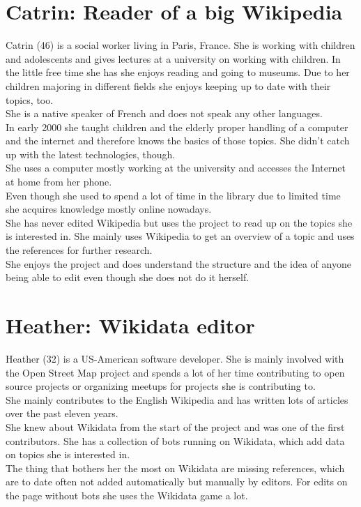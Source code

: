 \section{Catrin: Reader of a big Wikipedia}
Catrin (46) is a social worker living in Paris, France. She is working with children and adolescents and gives lectures at a university on working with children. In the little free time she has she enjoys reading and going to museums. Due to her children majoring in different fields she enjoys keeping up to date with their topics, too. \\
She is a native speaker of French and does not speak any other languages. \\
In early 2000 she taught children and the elderly proper handling of a computer and the internet and therefore knows the basics of those topics. She didn't catch up with the latest technologies, though. \\
She uses a computer mostly working at the university and accesses the Internet at home from her phone. \\
Even though she used to spend a lot of time in the library due to limited time she acquires knowledge mostly online nowadays. \\
She has never edited Wikipedia but uses the project to read up on the topics she is interested in. She mainly uses Wikipedia to get an overview of a topic and uses the references for further research. \\
She enjoys the project and does understand the structure and the idea of anyone being able to edit even though she does not do it herself. \\


\section{Heather: Wikidata editor}
Heather (32) is a US-American software developer. She is mainly involved with the Open Street Map project and spends a lot of her time contributing to open source projects or organizing meetups for projects she is contributing to. \\
She mainly contributes to the English Wikipedia and has written lots of articles over the past eleven years. \\
She knew about Wikidata from the start of the project and was one of the first contributors. She has a collection of bots running on Wikidata, which add data on topics she is interested in. \\
The thing that bothers her the most on Wikidata are missing references, which are to date often not added automatically but manually by editors. For edits on the page without bots she uses the Wikidata game a lot. 

